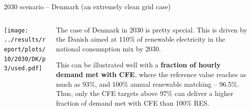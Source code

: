  
\begin{frame}{2030 scenario -- Denmark (an extremely clean grid case)}

  {\footnotesize

  \begin{columns}[T]
  \begin{column}{9cm}
  \centering

  \texttt{[image: ../results/report/plots/10/2030/DK/p3/used.pdf]}
  \end{column}
  \begin{column}{6cm}
  
  \vspace{0.5cm}
  The case of Denmark in 2030 is pretty special. This is driven by the Danish
  aimed at \alert{110\% of renewable electricity} in the national consumption mix by 2030.
      
  \vspace{0.3cm}
  This can be illustrated well with a {\bf fraction of hourly demand met with CFE}, where 
  the reference value reaches as much as \alert{93\%}, and 100\% annual renewable matching -- \alert{96.5\%}.
  Thus, only the \alert{CFE targets above 97\%} can deliver a higher fraction of demand met with CFE than
  100\% RES.

  \end{column}
  \end{columns}
  }
  \end{frame}
  
  
  

